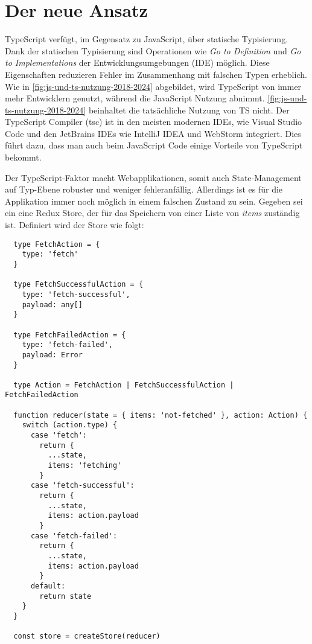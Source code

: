 \chapter{Der neue Ansatz} \label{der-neue-ansatz}

TypeScript verfügt, im Gegensatz zu JavaScript, über statische Typisierung. Dank der statischen Typisierung sind Operationen wie \textit{Go to Definition} und \textit{Go to Implementations} der Entwicklungsumgebungen (IDE) möglich. Diese Eigenschaften reduzieren Fehler im Zusammenhang mit falschen Typen erheblich. Wie in \ref{fig:js-und-ts-nutzung-2018-2024} abgebildet, wird TypeScript von immer mehr Entwicklern genutzt, während die JavaScript Nutzung abnimmt. \ref{fig:js-und-ts-nutzung-2018-2024} beinhaltet die tatsächliche Nutzung von TS nicht. Der TypeScript Compiler (tsc) ist in den meisten modernen IDEs, wie Visual Studio Code und den JetBrains IDEs wie IntelliJ IDEA und WebStorm integriert. Dies führt dazu, dass man auch beim JavaScript Code einige Vorteile von TypeScript bekommt.\cite{typeScriptDocumentary}

Der TypeScript-Faktor macht Webapplikationen, somit auch State-Management auf Typ-Ebene robuster und weniger fehleranfällig. Allerdings ist es für die Applikation immer noch möglich in einem falschen Zustand zu sein. Gegeben sei ein eine Redux Store, der für das Speichern von einer Liste von \textit{items} zuständig ist. Definiert wird der Store wie folgt:

\begin{lstlisting}
  type FetchAction = {
    type: 'fetch'
  }

  type FetchSuccessfulAction = {
    type: 'fetch-successful',
    payload: any[]
  }

  type FetchFailedAction = {
    type: 'fetch-failed',
    payload: Error
  }

  type Action = FetchAction | FetchSuccessfulAction | FetchFailedAction

  function reducer(state = { items: 'not-fetched' }, action: Action) {
    switch (action.type) {
      case 'fetch':
        return {
          ...state,
          items: 'fetching'
        }
      case 'fetch-successful':
        return {
          ...state,
          items: action.payload
        }
      case 'fetch-failed':
        return {
          ...state,
          items: action.payload
        }
      default:
        return state
    }
  }
  
  const store = createStore(reducer)
\end{lstlisting}


